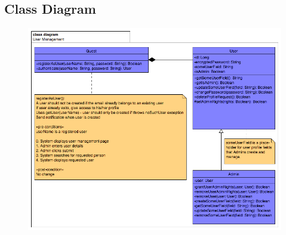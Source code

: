 \subsection{Class Diagram}

\begin{figure}[ht]
	\includegraphics[width=\textwidth]{User_Management/User Management Class Diagram.png}
\end{figure}
